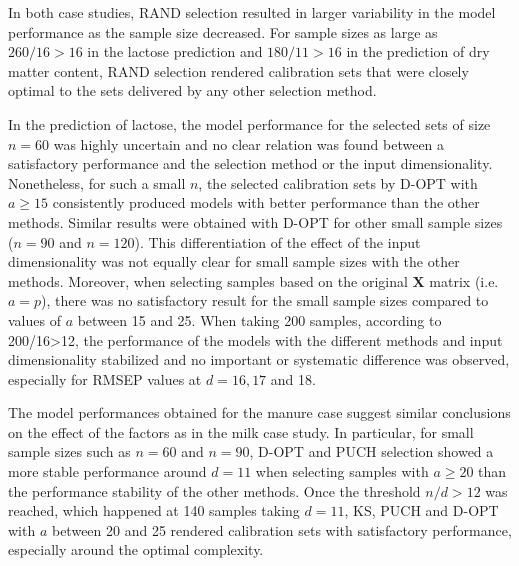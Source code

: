 \documentclass[journal=ancham,manuscript=article]{achemso}
\begin{document}
In both case studies, RAND selection resulted in larger variability in the model performance as the sample size decreased. For sample sizes as large as $260/16 > 16$ in the lactose prediction and $180/11 > 16$ in the prediction of dry matter content, RAND selection rendered calibration sets that were closely optimal to the sets delivered by any other selection method. 

In the prediction of lactose, the model performance for the selected sets of size $n=60$ was highly uncertain and no clear relation was found between a satisfactory performance and the selection method or the input dimensionality. Nonetheless, for such a small $n$, the selected calibration sets by D-OPT with $a \ge 15$ consistently produced models with better performance than the other methods. Similar results were obtained with D-OPT for other small sample sizes ($n=90$ and $n=120$). This differentiation of the effect of the input dimensionality was not equally clear for small sample sizes with the other methods. Moreover, when selecting samples based on the original $\mathbf{X}$ matrix (i.e. $a=p$), there was no satisfactory result for the small sample sizes compared to values of $a$ between 15 and 25. When taking 200 samples, according to 200/16>12, the performance of the models with the different methods and input dimensionality stabilized and no important or systematic difference was observed, especially for RMSEP values at $d=16, 17$ and 18.

The model performances obtained for the manure case suggest similar conclusions on the effect of the factors as in the milk case study. In particular, for small sample sizes such as $n=60$ and $n=90$, D-OPT and PUCH selection showed a more stable performance around $d = 11$ when selecting samples with $a \ge 20$ than the performance stability of the other methods. Once the threshold $n/d>12$ was reached, which happened at 140 samples taking $d=11$, KS, PUCH and D-OPT with $a$ between 20 and 25 rendered calibration sets with satisfactory performance, especially around the optimal complexity. 
\end{document}
